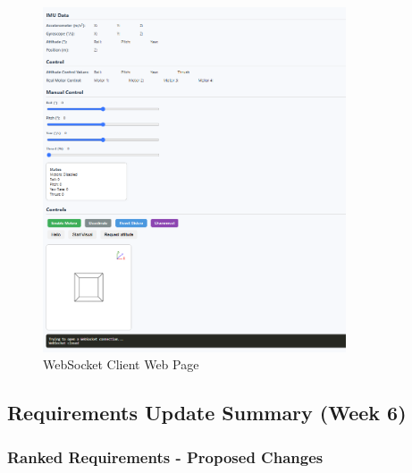 \begin{figure}[H]
    \centering
    \captionsetup{justification=centering, margin=1cm}
    \includegraphics[width=0.8\textwidth]{img/websocket-page.PNG}
    \caption{WebSocket Client Web Page}
\end{figure}

\pagebreak

\subsection{Requirements Update Summary (Week 6)}
\label{app:req-changes}

\subsubsection{Ranked Requirements - Proposed Changes}

